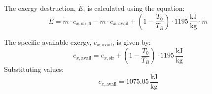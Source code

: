 The exergy destruction, \( \dot{E} \), is calculated using the equation:  
\[
\dot{E} = \dot{m} \cdot e_{x,\text{sir},6} - \dot{m} \cdot e_{x,\text{avail}} + \left(1 - \frac{T_0}{T_B}\right) \cdot 1195 \, \frac{\text{kJ}}{\text{kg}} \cdot \dot{m}
\]  

The specific available exergy, \( e_{x,\text{avail}} \), is given by:  
\[
e_{x,\text{avail}} = e_{x,\text{sir}} + \left(1 - \frac{T_0}{T_B}\right) \cdot 1195 \, \frac{\text{kJ}}{\text{kg}}
\]  
Substituting values:  
\[
e_{x,\text{avail}} = 1075.05 \, \frac{\text{kJ}}{\text{kg}}
\]